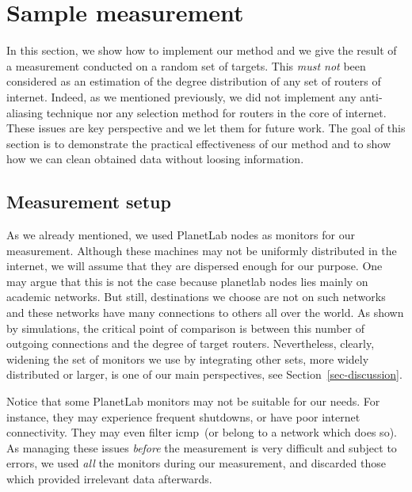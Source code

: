 \documentclass[conference]{IEEEtran}
\newcommand{\icmp}{{\sc icmp}}
\begin{document}
\section{Sample measurement}\label{sec-measurement}


In this section, we show how to implement our method and we give the result of a measurement conducted on a random set of targets. This \emph{must not} been considered as an estimation of the degree distribution of any set of routers of internet. Indeed, as we mentioned previously, we did not implement any anti-aliasing technique nor any selection method for routers in the core of internet. These issues are key perspective and we let them for future work. The goal of this section is to demonstrate the practical effectiveness of our method and to show how we can clean obtained data without loosing information.



\subsection{Measurement setup}\label{sec-setup}

As we already mentioned, we used PlanetLab nodes as monitors for our measurement. Although these machines may not be uniformly distributed in the internet, we will assume that they are dispersed enough for our purpose.
One may argue that this is not the case because planetlab nodes lies mainly on academic networks. But still, destinations we choose are not on such networks and these networks have many connections to others all over the world. As shown by simulations, the critical point of comparison is between this number of outgoing connections and the degree of target routers.
Nevertheless, clearly, widening the set of monitors we use by integrating other sets, more widely distributed or larger, is one of our main perspectives, see Section~\ref{sec-discussion}.

Notice that some PlanetLab monitors may not be suitable for our needs. For instance, they may experience frequent shutdowns, or have poor internet connectivity. They may even filter \icmp\ (or belong to a network which does so). As managing these issues {\em before} the measurement is very difficult and subject to errors, we used {\em all} the monitors during our measurement, and discarded those which provided irrelevant data afterwards.
\end{document}
